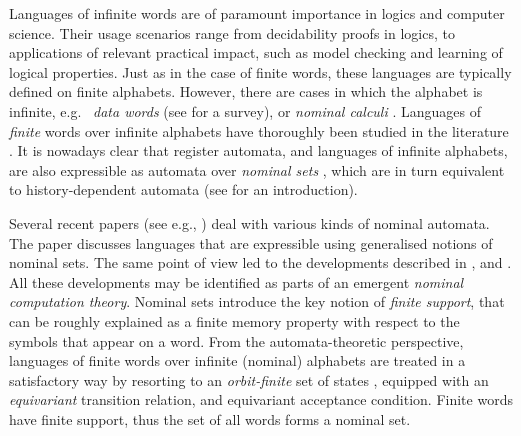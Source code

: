 


Languages of infinite words are of paramount importance in logics and computer science. Their usage scenarios range from decidability proofs in logics, 
 to applications of relevant practical impact, such as model checking and learning of logical properties. Just as in the case of finite words, these languages are typically defined on finite alphabets. However, there are cases in which the alphabet is infinite, e.g.\
\emph{data words} (see \cite{Seg06} for  a survey), or \emph{nominal calculi} \cite{MPW92}. Languages of \emph{finite} words over infinite alphabets have thoroughly been studied in the literature \cite{KF94,Tze11}. 
It is nowadays clear that register automata, and languages of infinite alphabets, are also expressible as automata over \emph{nominal sets} \cite{GP02}, which are in turn equivalent  to history-dependent automata \cite{Pistore99,StatonF06,GadducciMM06} (see \cite{CianciaTuostoTR} for an introduction). 

Several recent papers (see e.g., \cite{TOMOYUKI,GABBAYCIANCIA}) deal with various kinds of nominal automata. The paper \cite{MikLICS} discusses languages that are expressible using generalised notions of nominal sets. The same point of view led to the developments described in \cite{MikPOPL12}, and \cite{PittsPOPL13}. All these developments may be identified as parts of an emergent
\emph{nominal computation theory}. Nominal sets introduce the key notion of \emph{finite support}, that can be roughly explained as a finite memory property with respect to the symbols that appear on a word. From the automata-theoretic perspective, languages of finite words over infinite (nominal) alphabets are treated in a satisfactory way by resorting to an \emph{orbit-finite} set of states \cite{CianciaMontanariIC?}, equipped with an \emph{equivariant} transition relation, and equivariant acceptance condition. Finite words have finite support, thus the set of all words forms a nominal set. 

